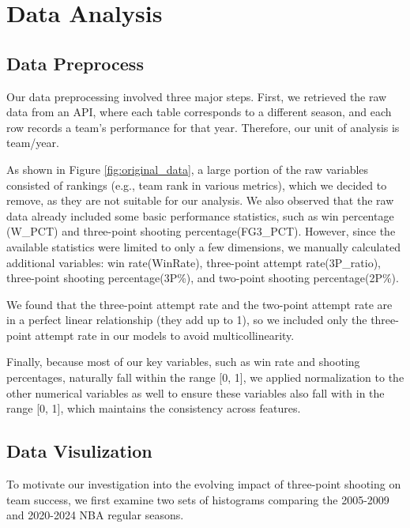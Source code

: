 \documentclass[11pt, a4paper]{article} %
\begin{document}

\section{Data Analysis}
\subsection{Data Preprocess}
Our data preprocessing involved three major steps. First, we retrieved the raw data from an API, where each table corresponds 
to a different season, and each row records a team's performance for that year. Therefore, our unit of analysis is team/year.

As shown in Figure \ref{fig:original_data}, a large portion of the raw variables consisted of rankings (e.g., team rank in various metrics), 
which we decided to remove, as they are not suitable for our analysis. We also observed that the raw data already included some 
basic performance statistics, such as win percentage (W\_PCT) and three-point shooting percentage(FG3\_PCT). However, since the available 
statistics were limited to only a few dimensions, we manually calculated additional variables: win rate(WinRate), three-point attempt rate(3P\_ratio), 
three-point shooting percentage(3P\%), and two-point shooting percentage(2P\%).

We found that the three-point attempt rate and the two-point attempt rate are in a perfect linear relationship (they add up to 1), 
so we included only the three-point attempt rate in our models to avoid multicollinearity.

Finally, because most of our key variables, such as win rate and shooting percentages, naturally fall within the range [0, 1], 
we applied normalization to the other numerical variables as well to ensure these variables also fall with in the range [0, 1], 
which maintains the consistency across features. 

\subsection{Data Visulization}
To motivate our investigation into the evolving impact of three-point shooting on team success, we first examine two sets of histograms 
comparing the 2005-2009 and 2020-2024 NBA regular seasons.
\end{document}

